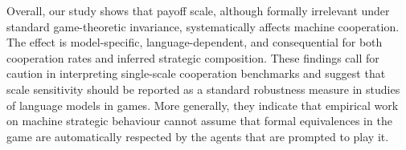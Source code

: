 \documentclass[11pt,a4paper]{article}
\begin{document}
Overall, our study shows that payoff scale, although formally irrelevant under standard game-theoretic invariance, systematically affects machine cooperation. The effect is model-specific, language-dependent, and consequential for both cooperation rates and inferred strategic composition. These findings call for caution in interpreting single-scale cooperation benchmarks and suggest that scale sensitivity should be reported as a standard robustness measure in studies of language models in games. More generally, they indicate that empirical work on machine strategic behaviour cannot assume that formal equivalences in the game are automatically respected by the agents that are prompted to play it.






\end{document}

